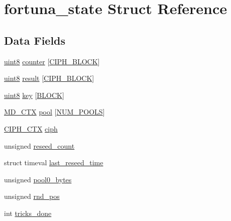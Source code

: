 \hypertarget{structfortuna__state}{\section{fortuna\-\_\-state Struct Reference}
\label{structfortuna__state}
}
\subsection*{Data Fields}
\begin{DoxyCompactItemize}
\item 
\hyperlink{c_8h_adde6aaee8457bee49c2a92621fe22b79}{uint8} \hyperlink{structfortuna__state_a98c15b091e0c6406775caf43044234ae}{counter} \mbox{[}\hyperlink{fortuna_8c_a9fe77c3b0290638cb826d1d21ea089f2}{C\-I\-P\-H\-\_\-\-B\-L\-O\-C\-K}\mbox{]}
\item 
\hyperlink{c_8h_adde6aaee8457bee49c2a92621fe22b79}{uint8} \hyperlink{structfortuna__state_a6331223fd25966c963e9cc2b6051d8ae}{result} \mbox{[}\hyperlink{fortuna_8c_a9fe77c3b0290638cb826d1d21ea089f2}{C\-I\-P\-H\-\_\-\-B\-L\-O\-C\-K}\mbox{]}
\item 
\hyperlink{c_8h_adde6aaee8457bee49c2a92621fe22b79}{uint8} \hyperlink{structfortuna__state_ab0661b7a7c12092dc667af5cdbd8d9cf}{key} \mbox{[}\hyperlink{fortuna_8c_a52220397ecea855b3a99746e451426e1}{B\-L\-O\-C\-K}\mbox{]}
\item 
\hyperlink{fortuna_8c_a048bfa4110aab2baeb19226a65ac2d65}{M\-D\-\_\-\-C\-T\-X} \hyperlink{structfortuna__state_a53d7ea36f61adaa577f1328071abc3e8}{pool} \mbox{[}\hyperlink{fortuna_8c_a2c5a4c46ba326a907d016cc28654e39e}{N\-U\-M\-\_\-\-P\-O\-O\-L\-S}\mbox{]}
\item 
\hyperlink{fortuna_8c_af34e82ca14c1a5b3552ff1f386b66e18}{C\-I\-P\-H\-\_\-\-C\-T\-X} \hyperlink{structfortuna__state_a95ce19ebcf8f4b5194747800cda1c30c}{ciph}
\item 
unsigned \hyperlink{structfortuna__state_aa8237da33b2f2838320097ed06837879}{reseed\-\_\-count}
\item 
struct timeval \hyperlink{structfortuna__state_a6d4e1a0a714f4826e1ac2568ef39362c}{last\-\_\-reseed\-\_\-time}
\item 
unsigned \hyperlink{structfortuna__state_aaf71b2ed6c86a11f8abbe5ee3277c4a5}{pool0\-\_\-bytes}
\item 
unsigned \hyperlink{structfortuna__state_a6b390be97975dff29c08c06ecf1bdb3a}{rnd\-\_\-pos}
\item 
int \hyperlink{structfortuna__state_a4ea7c5da5396b8f797f36993a98de5fe}{tricks\-\_\-done}
\end{DoxyCompactItemize}



